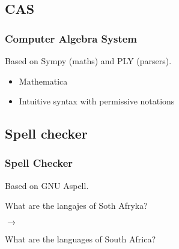 \subsection{CAS}
\begin{frame}[fragile]
    \frametitle{Computer Algebra System}
    Based on \alert{Sympy} (maths) and \alert{PLY} (parsers).
    
    \vfill    
    
    \begin{itemize}
        \item<3-> Mathematica
        \item<4-> Intuitive syntax with permissive notations 
    \end{itemize}
\end{frame}

\subsection{Spell checker}


\begin{frame}[fragile]
    \frametitle{Spell Checker}
    Based on \alert{GNU Aspell}.

    \medbreak

    What are the langajes of Soth Afryka?

    $\rightarrow$

    What are the languages of South Africa?
\end{frame}
